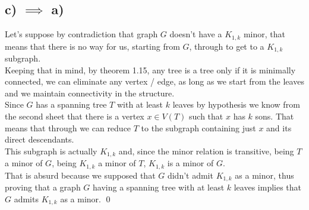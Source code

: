 \subsection*{c) $\implies$ a)}
Let's suppose by contradiction that graph $G$ doesn't have a $K_{1, k}$ minor, that means that there is no way for us, starting from $G$, through \lazyspc to get to a $K_{1, k}$ subgraph.\\
\linebreak
Keeping that in mind, by theorem 1.15, any tree is a tree only if it is minimally connected, we can eliminate any vertex / edge, as long as we start from the leaves and we maintain connectivity in the structure.\\
\linebreak
Since $G$ has a spanning tree $T$ with at least $k$ leaves by hypothesis we know from the second sheet that there is a vertex $x \in V(T)$ such that $x$ has $k$ sons. That means that through \lazyspc we can reduce $T$ to the subgraph containing just $x$ and its direct descendants.\\
This subgraph is actually $K_{1, k}$ and, since the minor relation is transitive, being $T$ a minor of $G$, being $K_{1, k}$ a minor of $T$, $K_{1, k}$ is a minor of $G$.\\
\linebreak
That is absurd because we supposed that $G$ didn't admit $K_{1, k}$ as a minor, thus proving that a graph $G$ having a spanning tree with at least $k$ leaves implies that $G$ admits $K_{1, k}$ as a minor. \qed